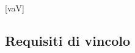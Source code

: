 
	[vaV]

	\newcommand{\ReqV}[3]{\stepcounter{vaV}R\thevaV V#1 & #2 & #3 \\}
	\newcommand{\subReqV}[3]{\stepcounter{secV}R\thevaV.\thesecV V#1 & #2 & #3 \\}






	\subsection{Requisiti di vincolo}\label{RequisitiVincolo}

